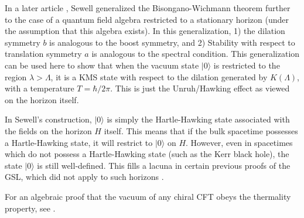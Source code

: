 \documentclass{article}
\begin{document}
In a later article \cite{sewell82}, Sewell generalized the Bisongano-Wichmann theorem further to the case of a quantum field algebra restricted to a stationary horizon (under the assumption that this algebra exists).  In this generalization, 1) the dilation symmetry $b$ is analogous to the boost symmetry, and 2) Stability with respect to translation symmetry $a$ is analogous to the spectral condition.  This generalization can be used here to show that when the vacuum state $|0\rangle$ is restricted to the region $\lambda > \Lambda$, it is a KMS state with respect to the dilation generated by $K(\Lambda)$, with a temperature $T = \hbar / 2\pi$.  This is just the Unruh/Hawking effect as viewed on the horizon itself.

In Sewell's construction, $|0\rangle$ is simply the Hartle-Hawking state associated with the fields on the horizon $H$ itself.  This means that if the bulk spacetime possesses a Hartle-Hawking state, it will restrict to $|0\rangle$ on $H$.  However, even in spacetimes which do not possess a Hartle-Hawking state (such as the Kerr black hole), the state $|0\rangle$ is still well-defined.  This fills a lacuna in certain previous proofs of the GSL, which did not apply to such horizons \cite{10proofs}.

For an algebraic proof that the vacuum of any chiral CFT obeys the thermality property, see \cite{gabbiani1993}.

\end{document}
